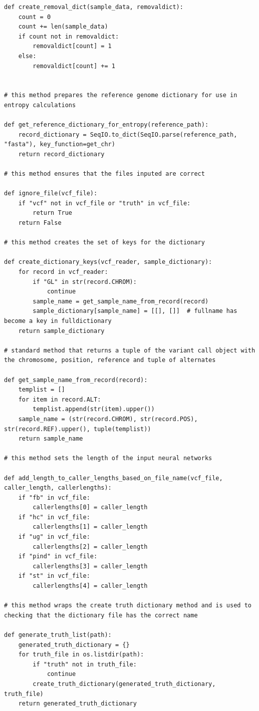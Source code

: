 \documentclass{article}
\begin{document}
\begin{verbatim}
def create_removal_dict(sample_data, removaldict):
    count = 0
    count += len(sample_data)
    if count not in removaldict:
        removaldict[count] = 1
    else:
        removaldict[count] += 1


# this method prepares the reference genome dictionary for use in entropy calculations

def get_reference_dictionary_for_entropy(reference_path):
    record_dictionary = SeqIO.to_dict(SeqIO.parse(reference_path, "fasta"), key_function=get_chr)
    return record_dictionary

# this method ensures that the files inputed are correct

def ignore_file(vcf_file):
    if "vcf" not in vcf_file or "truth" in vcf_file:
        return True
    return False

# this method creates the set of keys for the dictionary
	
def create_dictionary_keys(vcf_reader, sample_dictionary):
    for record in vcf_reader:
        if "GL" in str(record.CHROM):
            continue
        sample_name = get_sample_name_from_record(record)
        sample_dictionary[sample_name] = [[], []]  # fullname has become a key in fulldictionary
    return sample_dictionary

# standard method that returns a tuple of the variant call object with the chromosome, position, reference and tuple of alternates

def get_sample_name_from_record(record):
    templist = []
    for item in record.ALT:
        templist.append(str(item).upper())
    sample_name = (str(record.CHROM), str(record.POS), str(record.REF).upper(), tuple(templist))
    return sample_name

# this method sets the length of the input neural networks
	
def add_length_to_caller_lengths_based_on_file_name(vcf_file, caller_length, callerlengths):
    if "fb" in vcf_file:
        callerlengths[0] = caller_length
    if "hc" in vcf_file:
        callerlengths[1] = caller_length
    if "ug" in vcf_file:
        callerlengths[2] = caller_length
    if "pind" in vcf_file:
        callerlengths[3] = caller_length
    if "st" in vcf_file:
        callerlengths[4] = caller_length

# this method wraps the create truth dictionary method and is used to checking that the dictionary file has the correct name
		
def generate_truth_list(path):
    generated_truth_dictionary = {}
    for truth_file in os.listdir(path):
        if "truth" not in truth_file:
            continue
        create_truth_dictionary(generated_truth_dictionary, truth_file)
    return generated_truth_dictionary


\end{verbatim}
\end{document}
